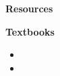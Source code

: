 \begin{frame}\begin{center}
		\LARGE\textbf{Resources}
\end{center}\end{frame}
\begin{frame}\textbf{Textbooks}\vspace{0.3cm}

\begin{itemize}\small
\item {}
\item {}
\end{itemize}

\end{frame}
